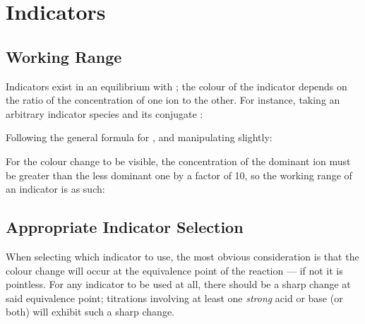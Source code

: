 







	\section{\MpH{} Indicators}

		\subsection{Working Range}

			Indicators exist in an equilibrium with ; the colour of the indicator depends on the ratio of the concentration of
			one ion to the other. For instance, taking an arbitrary indicator species  and its conjugate :


			Following the general formula for \Ka{}, and manipulating slightly:


			For the colour change to be visible, the concentration of the dominant ion must be greater than the less dominant one
			by a factor of 10, so the working range of an indicator is as such:





		\pagebreak
		\subsection{Appropriate Indicator Selection}

			When selecting which indicator to use, the most obvious consideration is that the colour change will occur at the equivalence
			point of the reaction --- if not it is pointless. For any indicator to be used at all, there should be a sharp change at said
			equivalence point; titrations involving at least one \textit{strong} acid or base (or both) will exhibit such a sharp change.

